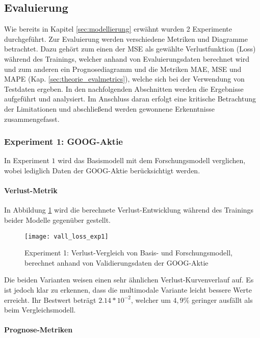 \newpage
\subsection{Evaluierung}\label{sec:evaluierung}

Wie bereits in Kapitel \ref{sec:modellierung} erwähnt wurden 2 Experimente durchgeführt. Zur Evaluierung werden verschiedene Metriken und Diagramme betrachtet. Dazu gehört zum einen der \ac{MSE} als gewählte Verlustfunktion (Loss) während des Trainings, welcher anhand von Evaluierungsdaten berechnet wird und zum anderen ein Prognosediagramm und die Metriken \ac{MAE}, \ac{MSE} und \ac{MAPE} (Kap. \ref{sec:theorie_evalmetrics}), welche sich bei der Verwendung von Testdaten ergeben.
In den nachfolgenden Abschnitten werden die Ergebnisse aufgeführt und analysiert. Im Anschluss daran erfolgt eine kritische Betrachtung der Limitationen und abschließend werden gewonnene Erkenntnisse zusammengefasst. 

\subsubsection{Experiment 1: GOOG-Aktie}\label{sec:evaluierung_exp1}
In Experiment $1$ wird das Basismodell mit dem Forschungsmodell verglichen, wobei lediglich Daten der GOOG-Aktie berücksichtigt werden. 

\paragraph*{Verlust-Metrik} 

In Abbildung \ref{fig:vall_loss_exp1} wird die berechnete Verlust-Entwicklung während des Trainings beider Modelle gegenüber gestellt.
\begin{figure}[H]
	\texttt{[image: vall\_loss\_exp1]}
	\caption{Experiment 1: Verlust-Vergleich von Basis- und Forschungsmodell, berechnet anhand von Validierungsdaten der GOOG-Aktie}
	\label{fig:vall_loss_exp1}
\end{figure}
Die beiden Varianten weisen einen sehr ähnlichen Verlust-Kurvenverlauf auf. Es ist jedoch klar zu erkennen, dass die multimodale Variante leicht bessere Werte erreicht. Ihr Bestwert beträgt $2.14*10^{-2}$, welcher um $4,9\%$ geringer ausfällt als beim Vergleichsmodell.

\paragraph*{Prognose-Metriken} 

